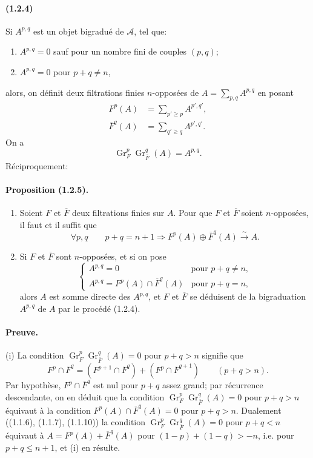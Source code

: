 \documentclass[10pt]{article}
\newcommand{\Gr}{\operatorname{Gr}}
\newcommand{\calA}{\mathcal A}
\newcommand{\iso}{\xrightarrow{\sim}}
\begin{document}
\paragraph{(1.2.4)} Si $A^{p,q}$ est un objet bigradué de $\calA$, tel que:
\begin{enumerate}[label=\alph*)]
\item $A^{p,q}=0$ sauf pour un nombre fini de couples $(p,q)$;
\item $A^{p,q}=0$ pour $p+q\ne n$,
\end{enumerate}
alors, on définit deux filtrations finies $n$-opposées de $A=\sum_{p,q}A^{p,q}$ en posant
\begin{align}
F^p(A)&=\sum_{p'\ge p} A^{p',q'}, \tag{1.2.4.1}\\
\overline F^q(A)&=\sum_{q'\ge q} A^{p',q'}. \tag{1.2.4.2}
\end{align}
On a
\[
\tag{1.2.4.3}
\Gr_F^p\Gr_{\overline F}^{q}(A)=A^{p,q}.
\]
Réciproquement:

\paragraph{Proposition (1.2.5).} \begin{enumerate}[label=(\roman*)]
\item Soient $F$ et $\overline F$ deux filtrations finies sur $A$. Pour que $F$ et $\overline F$ soient $n$-opposées, il faut et il suffit que
\[
\forall p,q\qquad p+q=n+1\Rightarrow F^p(A)\oplus\overline F^q(A)\iso A.
\]
\item Si $F$ et $\overline F$ sont $n$-opposées, et si on pose
\[
\begin{cases}
A^{p,q}=0 & \text{pour }p+q\ne n,\\
A^{p,q}=F^p(A)\cap\overline F^q(A) & \text{pour }p+q=n,
\end{cases}
\]
alors $A$ est somme directe des $A^{p,q}$, et $F$ et $\overline F$ se déduisent de la bigraduation $A^{p,q}$ de $A$ par le procédé (1.2.4).
\end{enumerate}

\paragraph{Preuve.} (i) La condition $\Gr_F^p\Gr_{\overline F}^q(A)=0$ pour $p+q>n$ signifie que
\[
F^p\cap\overline F^q=(F^{p+1}\cap\overline F^q)+(F^p\cap\overline F^{q+1})\qquad(p+q>n).
\]
Par hypothèse, $F^p\cap\overline F^q$ est nul pour $p+q$ assez grand; par récurrence descendante, on en déduit que la condition $\Gr_F^p\Gr_{\overline F}^q(A)=0$ pour $p+q>n$ équivaut à la condition $F^p(A)\cap\overline F^q(A)=0$ pour $p+q>n$. Dualement ((1.1.6), (1.1.7), (1.1.10)) la condition $\Gr_F^p\Gr_{\overline F}^q(A)=0$ pour $p+q<n$ équivaut à $A=F^p(A)+\overline F^q(A)$ pour $(1-p)+(1-q)>-n$, i.e. pour $p+q\le n+1$, et (i) en résulte.
\end{document}
